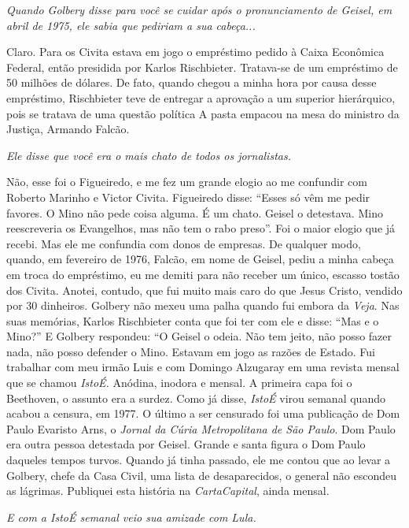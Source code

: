 \itshape
 Quando Golbery disse para você se cuidar após o
pronunciamento de Geisel, em abril de 1975, ele sabia que pediriam a sua
cabeça...

\normalfont 
Claro. Para os Civita estava em jogo o empréstimo pedido
à Caixa Econômica Federal, então presidida por Karlos Rischbieter.
Tratava-se de um empréstimo de 50 milhões de dólares. De fato, quando
chegou a minha hora por causa desse empréstimo, Rischbieter teve de
entregar a aprovação a um superior hierárquico, pois se tratava de uma
questão política A pasta empacou na mesa do ministro da Justiça, Armando
Falcão.

\itshape
 Ele disse que você era o mais chato de todos os
jornalistas.

\normalfont 
Não, esse foi o Figueiredo, e me fez um grande elogio ao
me confundir com Roberto Marinho e Victor Civita. Figueiredo disse:
``Esses só vêm me pedir favores. O Mino não pede coisa alguma. É um
chato. Geisel o detestava. Mino reescreveria os Evangelhos, mas não tem
o rabo preso''. Foi o maior elogio que já recebi. Mas ele me confundia
com donos de empresas. De qualquer modo, quando, em fevereiro de 1976,
Falcão, em nome de Geisel, pediu a minha cabeça em troca do empréstimo,
eu me demiti para não receber um único, escasso tostão dos Civita.
Anotei, contudo, que fui muito mais caro do que Jesus Cristo, vendido
por 30 dinheiros. Golbery não mexeu uma palha quando fui embora da
\emph{Veja}. Nas suas memórias, Karlos Rischbieter conta que foi ter com
ele e disse: ``Mas e o Mino?'' E Golbery respondeu: ``O Geisel o odeia.
Não tem jeito, não posso fazer nada, não posso defender o Mino. Estavam
em jogo as razões de Estado. Fui trabalhar com meu irmão Luis e com
Domingo Alzugaray em uma revista mensal que se chamou \emph{IstoÉ.}
Anódina, inodora e mensal. A primeira capa foi o Beethoven, o assunto
era a surdez. Como já disse, \emph{IstoÉ} virou semanal quando acabou a
censura, em 1977. O último a ser censurado foi uma publicação de Dom
Paulo Evaristo Arns, o \emph{Jornal da Cúria Metropolitana de São
Paulo}. Dom Paulo era outra pessoa detestada por Geisel. Grande e santa
figura o Dom Paulo daqueles tempos turvos. Quando já tinha passado, ele
me contou que ao levar a Golbery, chefe da Casa Civil, uma lista de
desaparecidos, o general não escondeu as lágrimas. Publiquei esta
história na \emph{CartaCapital}, ainda mensal.

\itshape
 E com a \emph{IstoÉ} semanal veio sua amizade com Lula.

